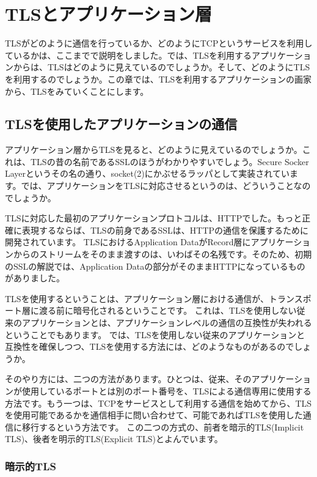 \chapter{TLSとアプリケーション層}

TLSがどのように通信を行っているか、どのようにTCPというサービスを利用しているかは、ここまでで説明をしました。では、TLSを利用するアプリケーションからは、TLSはどのように見えているのでしょうか。そして、どのようにTLSを利用するのでしょうか。この章では、TLSを利用するアプリケーションの画家から、TLSをみていくことにします。

\section{TLSを使用したアプリケーションの通信}

アプリケーション層からTLSを見ると、どのように見えているのでしょうか。これは、TLSの昔の名前であるSSLのほうがわかりやすいでしょう。Secure Socker Layerというその名の通り、socket(2)にかぶせるラッパとして実装されています。では、アプリケーションをTLSに対応させるというのは、どういうことなのでしょうか。

TLSに対応した最初のアプリケーションプロトコルは、HTTPでした。もっと正確に表現するならば、TLSの前身であるSSLは、HTTPの通信を保護するために開発されています。
TLSにおけるApplication DataがRecord層にアプリケーションからのストリームをそのまま渡すのは、いわばその名残です。そのため、初期のSSLの解説では、Application Dataの部分がそのままHTTPになっているものがありました。

TLSを使用するということは、アプリケーション層における通信が、トランスポート層に渡る前に暗号化されるということです。
これは、TLSを使用しない従来のアプリケーションとは、アプリケーションレベルの通信の互換性が失われるということでもあります。
では、TLSを使用しない従来のアプリケーションと互換性を確保しつつ、TLSを使用する方法には、どのようなものがあるのでしょうか。

そのやり方には、二つの方法があります。ひとつは、従来、そのアプリケーションが使用しているポートとは別のポート番号を、TLSによる通信専用に使用する方法です。もう一つは、TCPをサービスとして利用する通信を始めてから、TLSを使用可能であるかを通信相手に問い合わせて、可能であればTLSを使用した通信に移行するという方法です。
この二つの方式の、前者を暗示的TLS(Implicit TLS)、後者を明示的TLS(Explicit TLS)とよんでいます。

\subsection{暗示的TLS}

